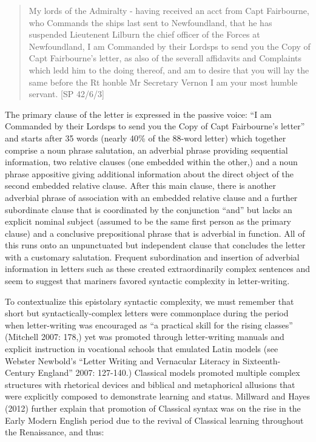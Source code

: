 \documentclass[12pt]{article}
\newenvironment{styleStandard}{\renewcommand\baselinestretch{1.0}\setlength\leftskip{0cm}\setlength\rightskip{0cm plus 1fil}\setlength\parindent{0cm}\setlength\parfillskip{0pt plus 1fil}\setlength\parskip{0in plus 1pt}\writerlistparindent\writerlistleftskip\leavevmode\normalfont\normalsize\writerlistlabel\ignorespaces}{\unskip\vspace{0in plus 1pt}\par}
\newcommand\writerlistleftskip{}
\newcommand\writerlistparindent{}
\newcommand\writerlistlabel{}
\begin{document}
\begin{quotation}
My lords of the Admiralty - having received an acct from Capt Fairbourne, who Commands the ships last sent to Newfoundland, that he has suspended Lieutenent Lilburn the chief officer of the Forces at Newfoundland, I am Commanded by their Lordsps to send you the Copy of Capt Fairbourne’s letter, as also of the severall affidavits and Complaints which ledd him to the doing thereof, and am to desire that you will lay the same before the Rt honble Mr Secretary Vernon I am your most humble servant. [SP 42/6/3] 

\end{quotation}
\begin{styleStandard}
The primary clause of the letter is expressed in the passive voice: “I am Commanded by their Lordsps to send you the Copy of Capt Fairbourne’s letter” and starts after 35 words (nearly 40\% of the 88-word letter) which together comprise a noun phrase salutation, an adverbial phrase providing sequential information, two relative clauses (one embedded within the other,) and a noun phrase appositive giving additional information about the direct object of the second embedded relative clause. After this main clause, there is another adverbial phrase of association with an embedded relative clause and a further subordinate clause that is coordinated by the conjunction “and” but lacks an explicit nominal subject (assumed to be the same first person as the primary clause) and a conclusive prepositional phrase that is adverbial in function. All of this runs onto an unpunctuated but independent clause that concludes the letter with a customary salutation. Frequent subordination and insertion of adverbial information in letters such as these created extraordinarily complex sentences and seem to suggest that mariners favored syntactic complexity in letter-writing. \ 
\end{styleStandard}


\begin{styleStandard}
To contextualize this epistolary syntactic complexity, we must remember that short but syntactically-complex letters were commonplace during the period when letter-writing was encouraged as “a practical skill for the rising classes” (Mitchell 2007: 178,) yet was promoted through letter-writing manuals and explicit instruction in vocational schools that emulated Latin models (see Webster Newbold’s “Letter Writing and Vernacular Literacy in Sixteenth-Century England” 2007: 127-140.) Classical models promoted multiple complex structures with rhetorical devices and biblical and metaphorical allusions that were explicitly composed to demonstrate learning and status. Millward and Hayes (2012) further explain that promotion of Classical syntax was on the rise in the Early Modern English period due to the revival of Classical learning throughout the Renaissance, and thus:
\end{styleStandard}
\end{document}
